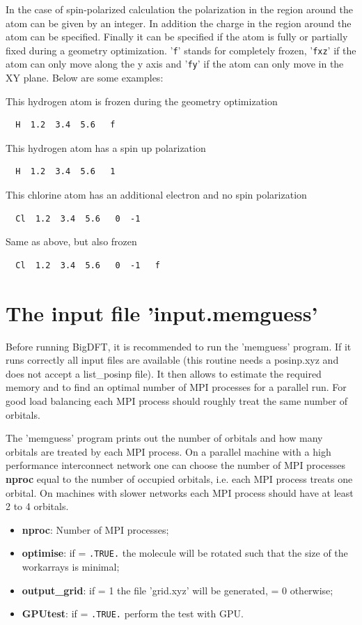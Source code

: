 \documentclass[a4paper,11pt]{report}
\begin{document}
In the case of spin-polarized calculation the polarization in the region around the atom can 
be given by an integer. In addition the charge in the region around the atom can be specified.
Finally it can be specified if the atom is fully or partially fixed during a geometry optimization.
'\texttt{f}' stands for completely frozen, '\texttt{fxz}' if the atom can only move along the y axis and '\texttt{fy}' if the atom 
can only move in the XY plane. Below are some examples:

This hydrogen atom is frozen during the geometry optimization
\begin{verbatim}
  H  1.2  3.4  5.6   f
\end{verbatim}

This hydrogen atom has a spin up polarization
\begin{verbatim}
  H  1.2  3.4  5.6   1
\end{verbatim}

This chlorine atom has an additional electron and no spin polarization
\begin{verbatim}
  Cl  1.2  3.4  5.6   0  -1
\end{verbatim}

Same as above, but also frozen
\begin{verbatim}
  Cl  1.2  3.4  5.6   0  -1   f
\end{verbatim}

\section{The input file 'input.memguess'}
Before running BigDFT, it is recommended to run the 'memguess' program. If it runs correctly all input files are available 
(this routine needs a posinp.xyz and does not accept a list\_posinp file). It then allows to estimate the required memory and to 
find an optimal number of MPI processes for a parallel run. For good load balancing each MPI process should roughly treat the same number of orbitals.

The 'memguess' program prints out the number of orbitals and how many orbitals are treated by each MPI process. 
On a parallel machine with a high performance interconnect network one can choose the number of MPI processes {\bf nproc} equal 
to the number of occupied orbitals, i.e. each MPI process treats one orbital. On machines with slower networks each MPI process should 
have at least 2 to 4 orbitals. 
\begin{itemize}
\item {\bf nproc}: Number of MPI processes;
\item {\bf optimise}: if = \texttt{.TRUE.} the molecule will be rotated such that the size of the workarrays is minimal;
\item {\bf output\_grid}: if = 1 the file 'grid.xyz' will be generated, = 0 otherwise;
\item {\bf GPUtest}: if = \texttt{.TRUE.} perform the test with GPU.
\end{itemize}
\end{document}
